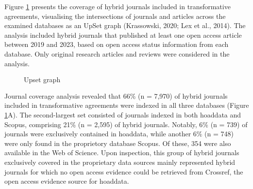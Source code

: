 \documentclass[a4paper,man,floatsintext,longtable,noextraspace,10pt]{apa6}
\begin{document}
Figure \ref{fig-upset_coverage_results} presents the coverage of hybrid
journals included in transformative agreements, visualising the
intersections of journals and articles across the examined databases as
an UpSet graph (Krassowski, 2020; Lex et al., 2014). The analysis
included hybrid journals that published at least one open access article
between 2019 and 2023, based on open access status information from each
database. Only original research articles and reviews were considered in
the analysis.

\begin{figure}[ht!]


\caption{\label{fig-upset_coverage_results}Upset graph}

\end{figure}%

Journal coverage analysis revealed that 66\% (n = 7,970) of hybrid
journals included in transformative agreements were indexed in all three
databases (Figure \ref{fig-upset_coverage_results}A). The second-largest
set consisted of journals indexed in both hoaddata and Scopus,
comprising 21\% (n = 2,595) of hybrid journals. Notably, 6\% (n = 739)
of journals were exclusively contained in hoaddata, while another 6\% (n
= 748) were only found in the proprietory database Scopus. Of these, 354
were also available in the Web of Science. Upon inspection, this group
of hybrid journals exclusively covered in the proprietary data sources
mainly represented hybrid journals for which no open access evidence
could be retrieved from Crossref, the open access evidence source for
hoaddata.
\end{document}
